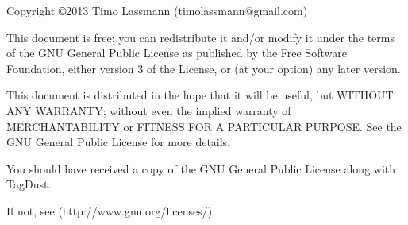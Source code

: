 \documentclass[11pt,a4paper,oneside]{book}
\begin{document}
\frontmatter
\newlength{\centeroffset}
\thispagestyle{empty}
\noindent\hspace*{\centeroffset}

\noindent\hspace*{\centeroffset}



\pagebreak
\begin{small} 

Copyright \copyright 2013 Timo Lassmann (timolassmann@gmail.com)
 
 This document is free;  you can redistribute it and/or modify
 it under the terms of the GNU General Public License as published by
 the Free Software Foundation, either version 3 of the License, or
 (at your option) any later version.
 
 This document is distributed in the hope that it will be useful,
 but WITHOUT ANY WARRANTY; without even the implied warranty of
 MERCHANTABILITY or FITNESS FOR A PARTICULAR PURPOSE.  See the
 GNU General Public License for more details.
 
 You should have received a copy of the GNU General Public License
 along with TagDust.  
 
 If not, see (http://www.gnu.org/licenses/).



\end{small}
\end{document}
